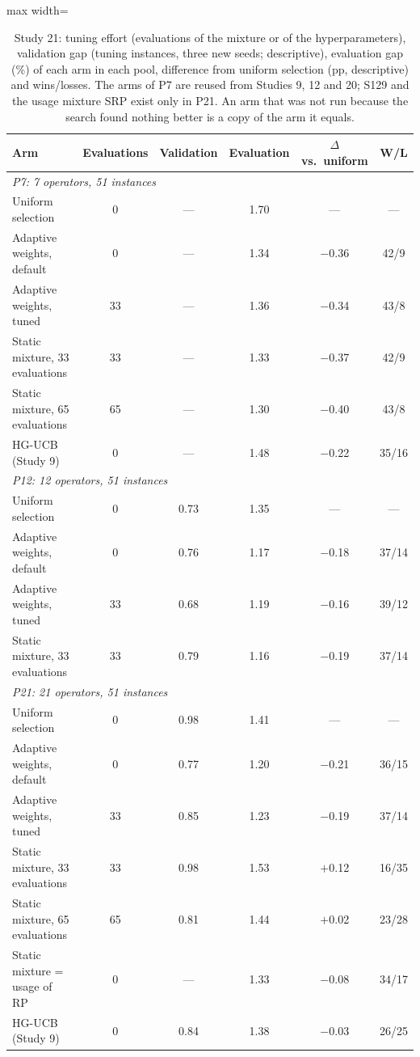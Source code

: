 \begin{table}[t]
\caption{Study 21: tuning effort (evaluations of the mixture or of the hyperparameters), validation gap (tuning instances, three new seeds; descriptive), evaluation gap (\%) of each arm in each pool, difference from uniform selection (pp, descriptive) and wins/losses. The arms of P7 are reused from Studies 9, 12 and 20; S129 and the usage mixture SRP exist only in P21. An arm that was not run because the search found nothing better is a copy of the arm it equals.}\label{tab:s21a}
\centering
\small
\begin{adjustbox}{max width=\linewidth}
\begin{tabular}{lccccc}
\toprule
Arm & Evaluations & Validation & Evaluation & $\Delta$ vs.\ uniform & W/L \\
\midrule
\multicolumn{6}{l}{\emph{P7: 7 operators, 51 instances}} \\
Uniform selection & 0 & --- & 1.70 & --- & --- \\
Adaptive weights, default & 0 & --- & 1.34 & $-$0.36 & 42/9 \\
Adaptive weights, tuned & 33 & --- & 1.36 & $-$0.34 & 43/8 \\
Static mixture, 33 evaluations & 33 & --- & 1.33 & $-$0.37 & 42/9 \\
Static mixture, 65 evaluations & 65 & --- & 1.30 & $-$0.40 & 43/8 \\
HG-UCB (Study 9) & 0 & --- & 1.48 & $-$0.22 & 35/16 \\
\multicolumn{6}{l}{\emph{P12: 12 operators, 51 instances}} \\
Uniform selection & 0 & 0.73 & 1.35 & --- & --- \\
Adaptive weights, default & 0 & 0.76 & 1.17 & $-$0.18 & 37/14 \\
Adaptive weights, tuned & 33 & 0.68 & 1.19 & $-$0.16 & 39/12 \\
Static mixture, 33 evaluations & 33 & 0.79 & 1.16 & $-$0.19 & 37/14 \\
\multicolumn{6}{l}{\emph{P21: 21 operators, 51 instances}} \\
Uniform selection & 0 & 0.98 & 1.41 & --- & --- \\
Adaptive weights, default & 0 & 0.77 & 1.20 & $-$0.21 & 36/15 \\
Adaptive weights, tuned & 33 & 0.85 & 1.23 & $-$0.19 & 37/14 \\
Static mixture, 33 evaluations & 33 & 0.98 & 1.53 & $+$0.12 & 16/35 \\
Static mixture, 65 evaluations & 65 & 0.81 & 1.44 & $+$0.02 & 23/28 \\
Static mixture = usage of RP & 0 & --- & 1.33 & $-$0.08 & 34/17 \\
HG-UCB (Study 9) & 0 & 0.84 & 1.38 & $-$0.03 & 26/25 \\
\bottomrule
\end{tabular}
\end{adjustbox}
\end{table}
